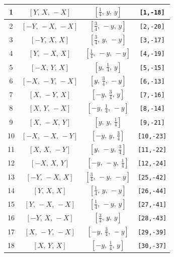 \documentclass[fleqn,8pt]{jsarticle}
\begin{document}
\begin{longtable}{cccc}
1 & $\left[ Y,\, X,\, - X \right]$ & $\left[ \frac{1}{4},\, y,\, y \right]$ & {\tt [1,-18]} \\ \hline
2 & $\left[ - Y,\, - X,\, - X \right]$ & $\left[ \frac{3}{4},\, - y,\, y \right]$ & {\tt [2,-20]} \\ \hline
3 & $\left[ - Y,\, X,\, X \right]$ & $\left[ \frac{3}{4},\, y,\, - y \right]$ & {\tt [3,-17]} \\ \hline
4 & $\left[ Y,\, - X,\, X \right]$ & $\left[ \frac{1}{4},\, - y,\, - y \right]$ & {\tt [4,-19]} \\ \hline
5 & $\left[ - X,\, Y,\, X \right]$ & $\left[ y,\, \frac{1}{4},\, y \right]$ & {\tt [5,-15]} \\ \hline
6 & $\left[ - X,\, - Y,\, - X \right]$ & $\left[ y,\, \frac{3}{4},\, - y \right]$ & {\tt [6,-13]} \\ \hline
7 & $\left[ X,\, - Y,\, X \right]$ & $\left[ - y,\, \frac{3}{4},\, y \right]$ & {\tt [7,-16]} \\ \hline
8 & $\left[ X,\, Y,\, - X \right]$ & $\left[ - y,\, \frac{1}{4},\, - y \right]$ & {\tt [8,-14]} \\ \hline
9 & $\left[ X,\, - X,\, Y \right]$ & $\left[ y,\, y,\, \frac{1}{4} \right]$ & {\tt [9,-21]} \\ \hline
10 & $\left[ - X,\, - X,\, - Y \right]$ & $\left[ - y,\, y,\, \frac{3}{4} \right]$ & {\tt [10,-23]} \\ \hline
11 & $\left[ X,\, X,\, - Y \right]$ & $\left[ y,\, - y,\, \frac{3}{4} \right]$ & {\tt [11,-22]} \\ \hline
12 & $\left[ - X,\, X,\, Y \right]$ & $\left[ - y,\, - y,\, \frac{1}{4} \right]$ & {\tt [12,-24]} \\ \hline
13 & $\left[ - Y,\, - X,\, X \right]$ & $\left[ \frac{3}{4},\, - y,\, - y \right]$ & {\tt [25,-42]} \\ \hline
14 & $\left[ Y,\, X,\, X \right]$ & $\left[ \frac{1}{4},\, y,\, - y \right]$ & {\tt [26,-44]} \\ \hline
15 & $\left[ Y,\, - X,\, - X \right]$ & $\left[ \frac{1}{4},\, - y,\, y \right]$ & {\tt [27,-41]} \\ \hline
16 & $\left[ - Y,\, X,\, - X \right]$ & $\left[ \frac{3}{4},\, y,\, y \right]$ & {\tt [28,-43]} \\ \hline
17 & $\left[ X,\, - Y,\, - X \right]$ & $\left[ - y,\, \frac{3}{4},\, - y \right]$ & {\tt [29,-39]} \\ \hline
18 & $\left[ X,\, Y,\, X \right]$ & $\left[ - y,\, \frac{1}{4},\, y \right]$ & {\tt [30,-37]} \\ \hline

\end{longtable}
\end{document}

